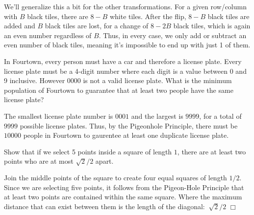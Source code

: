 \begin{solution}
    We'll generalize this a bit for the other transformations. For a given row/column with $B$ black tiles, there are $8-B$ white tiles. After the flip, $8-B$ black tiles are added and $B$ black tiles are lost, for a change of $8-2B$ black tiles, which is again an even number regardless of $B$. Thus, in every case, we only add or subtract an even number of black tiles, meaning it's impossible to end up with just 1 of them.
\end{solution}

\begin{problem}
    In Fourtown, every person must have a car and therefore a license plate. Every license plate must be a 4-digit number where each digit is a value between 0 and 9 inclusive. However 0000 is not a valid license plate. What is the minimum population of Fourtown to guarantee that at least two people have the same license plate?
\end{problem}

\begin{solution}
    The smallest license plate number is $0001$ and the largest is $9999$, for a total of $9999$ possible license plates. Thus, by the Pigeonhole Principle, there must be $\boxed{10000}$ people in Fourtown to gaurentee at least one duplicate license plate.
\end{solution}


\begin{problem}[C][3]
    Show that if we select 5 points inside a square of length $1$, there are at least two points who are at most $\sqrt{2}/2$ apart.
\end{problem}

\begin{solution}
    Join the middle points of the square to create four equal squares of length $1/2$. Since we are selecting five points, it follows from the Pigeon-Hole Principle that at least two points are contained within the same square. Where the maximum distance that can exist between them is the length of the diagonal: $\ \sqrt 2 / 2$ $\Box$
\end{solution}

